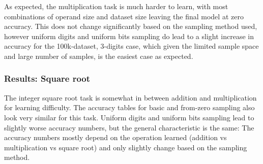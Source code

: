 As expected, the multiplication task is much harder to learn, with most combinations of operand size and dataset size leaving the final model at zero accuracy. This does not change significantly based on the sampling method used, however uniform digits and uniform bits sampling do lead to a  slight increase in accuracy for the 100k-dataset, 3-digits case, which given the limited sample space and large number of samples, is the easiest case as expected.

\subsubsection{Results: Square root}


\begin{table}[H]
    \begin{minipage}[t]{0.47\linewidth}
        \hfill
    \end{minipage}
    \hfill
    \begin{minipage}[t]{0.47\linewidth}
        \hfill
    \end{minipage}

    \vspace{0.5cm}
    \begin{minipage}[t]{0.47\linewidth}
        \hfill
    \end{minipage}
    \hfill
    \begin{minipage}[t]{0.47\linewidth}
        \hfill
    \end{minipage}
    \label{tbl:sampling_strategies_sqrt}
\end{table}

The integer square root task is somewhat in between addition and multiplication  for learning difficulty. The accuracy tables for basic and from-zero sampling also look very similar for this task.  Uniform digits and uniform bits sampling lead to slightly worse accuracy numbers, but the general characteristic is the same: The accuracy numbers mostly depend on the operation learned (addition vs multiplication vs square root) and only slightly change based on the sampling method.





